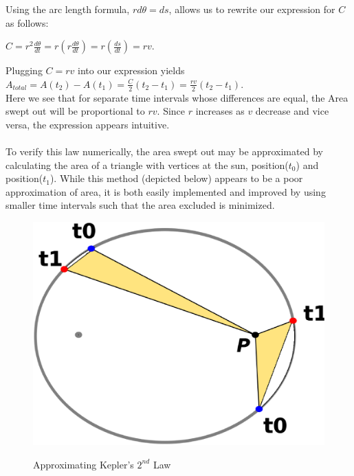 \documentclass{report}
\begin{document}
\begin{enumerate}
Using the arc length formula, $rd\theta = ds$, allows us to rewrite our expression for $C$ as follows:

\begin{center}$C = r^2\frac{d\theta}{dt} = r(r\frac{d\theta}{dt}) = r(\frac{ds}{dt}) = rv$.
\end{center}
Plugging $C=rv$ into our expression yields $\displaystyle A_{total}=A(t_2)-A(t_1)=\frac{C}{2}(t_2-t_1) = \frac{rv}{2}(t_2-t_1)$.
\\
Here we see that for separate time intervals whose differences are equal, the Area swept out will be proportional to $rv$. Since $r$ increases as $v$ decrease and vice versa, the expression appears intuitive. 
\\
\\To verify this law numerically, the area swept out may be approximated by calculating the area of a triangle with vertices at the sun, position($t_{0}$) and position($t_{1}$). While this method (depicted below) appears to be a poor approximation of area, it is both easily implemented and improved by using smaller time intervals such that the area excluded is minimized.  
\begin{figure}[H]
\centering \caption{Approximating Kepler's $2^{nd}$ Law }
\includegraphics[scale=.25]{keplers2nd.eps}
\label{keplers2nd}
\end{figure}


\end{enumerate}
\end{document}
